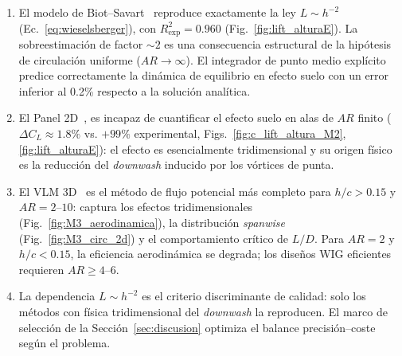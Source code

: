 \documentclass[twocolumn]{article}
\begin{document}
\begin{enumerate}
  \item El modelo de Biot--Savart~\cite{wieselsberger1922} reproduce
    exactamente la ley $L \sim h^{-2}$ (Ec.~\eqref{eq:wieselsberger}),
    con $R^2_\text{exp} = 0.960$ (Fig.~\ref{fig:lift_alturaE}).
    La sobreestimación de factor ${\sim}2$ es una consecuencia
    estructural de la hipótesis de circulación uniforme
    ($\mathit{AR} \to \infty$). El integrador de punto medio explícito
    predice correctamente la dinámica de equilibrio en efecto suelo
    con un error inferior al 0.2\% respecto a la solución analítica.
  \item El Panel 2D~\cite{hess1967}, es incapaz de cuantificar el efecto
    suelo en alas de $\mathit{AR}$ finito ($\Delta C_L \approx 1.8\%$
    vs. $+99\%$ experimental, Figs.~\ref{fig:c_lift_altura_M2},
    \ref{fig:lift_alturaE}): el efecto es esencialmente tridimensional
    y su origen físico es la reducción del \textit{downwash} inducido
    por los vórtices de punta.
  \item El VLM 3D~\cite{katz2001} es el método de flujo potencial más
    completo para $h/c > 0.15$ y $\mathit{AR} = 2$--$10$: captura
    los efectos tridimensionales (Fig.~\ref{fig:M3_aerodinamica}), la
    distribución \textit{spanwise} (Fig.~\ref{fig:M3_circ_2d}) y el
    comportamiento crítico de $L/D$. Para $\mathit{AR} = 2$ y
    $h/c < 0.15$, la eficiencia aerodinámica se degrada;
    los diseños WIG eficientes requieren $\mathit{AR} \geq 4$--$6$.
  \item La dependencia $L \sim h^{-2}$ es el criterio discriminante
    de calidad: solo los métodos con física tridimensional del
    \textit{downwash} la reproducen. El marco de selección de la
    Sección~\ref{sec:discusion} optimiza el balance
    precisión--coste según el problema.
\end{enumerate}

\printbibliography
\end{document}

